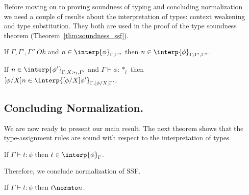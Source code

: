 Before moving on to proving soundness of typing and concluding
normalization we need a couple of results about the interpretation of
types: context weakening and type substitution.  They both are used in
the proof of the type soundness theorem
(Theorem~\ref{thm:soundness_ssf}).

\begin{lemma}
  If $\Gamma,\Gamma',\Gamma''\ Ok$ and $n \in \interp{\phi}_{\Gamma,\Gamma''}$ then 
  $n \in \interp{\phi}_{\Gamma,\Gamma',\Gamma''}$.
  \label{lemma:context_weakening_interpretations_ssf}
\end{lemma}

\begin{lemma}
  If $n \in \interp{\phi'}_{\Gamma,X:*_l,\Gamma'}$ and 
  $\Gamma \vdash \phi:*_l$ then 
  $[\phi/X]n \in \interp{[\phi/X]\phi'}_{\Gamma,[\phi/X]\Gamma'}$.
  \label{lemma:type_sub_ssf}
\end{lemma}

\subsection{Concluding Normalization.}
\label{subsec:soundness_of_typing_ssf}
We are now ready to present our main result.  The next theorem shows
that the type-assignment rules are sound with respect to the
interpretation of types.  

\begin{thm}
  If $\Gamma \vdash t:\phi$ then $t \in \interp{\phi}_\Gamma$.
  \label{thm:soundness_ssf}
\end{thm}
\noindent Therefore, we conclude normalization of SSF.
\begin{corollary}[Normalization]
  If $\Gamma \vdash t:\phi$ then $t \normto n$.
\end{corollary}
